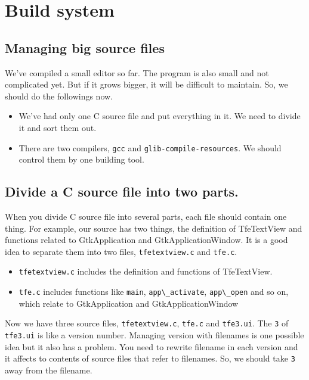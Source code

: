 \section{Build system}\label{build-system}

\subsection{Managing big source files}\label{managing-big-source-files}

We've compiled a small editor so far. The program is also small and not
complicated yet. But if it grows bigger, it will be difficult to
maintain. So, we should do the followings now.

\begin{itemize}
\tightlist
\item
  We've had only one C source file and put everything in it. We need to
  divide it and sort them out.
\item
  There are two compilers, \passthrough{\lstinline!gcc!} and
  \passthrough{\lstinline!glib-compile-resources!}. We should control
  them by one building tool.
\end{itemize}

\subsection{Divide a C source file into two
parts.}\label{divide-a-c-source-file-into-two-parts.}

When you divide C source file into several parts, each file should
contain one thing. For example, our source has two things, the
definition of TfeTextView and functions related to GtkApplication and
GtkApplicationWindow. It is a good idea to separate them into two files,
\passthrough{\lstinline!tfetextview.c!} and
\passthrough{\lstinline!tfe.c!}.

\begin{itemize}
\tightlist
\item
  \passthrough{\lstinline!tfetextview.c!} includes the definition and
  functions of TfeTextView.
\item
  \passthrough{\lstinline!tfe.c!} includes functions like
  \passthrough{\lstinline!main!},
  \passthrough{\lstinline!app\_activate!},
  \passthrough{\lstinline!app\_open!} and so on, which relate to
  GtkApplication and GtkApplicationWindow
\end{itemize}

Now we have three source files, \passthrough{\lstinline!tfetextview.c!},
\passthrough{\lstinline!tfe.c!} and \passthrough{\lstinline!tfe3.ui!}.
The \passthrough{\lstinline!3!} of \passthrough{\lstinline!tfe3.ui!} is
like a version number. Managing version with filenames is one possible
idea but it also has a problem. You need to rewrite filename in each
version and it affects to contents of source files that refer to
filenames. So, we should take \passthrough{\lstinline!3!} away from the
filename.

